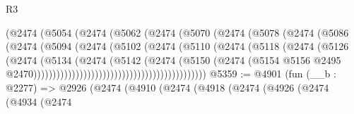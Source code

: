 \begin{lexlean}{R3}
\begin{coremodule}
                                      (@2474
                                        (@5054
                                          (@2474
                                            (@5062
                                              (@2474
                                                (@5070
                                                  (@2474
                                                    (@5078
                                                      (@2474
                                                        (@5086
                                                          (@2474
                                                            (@5094
                                                              (@2474
                                                                (@5102
                                                                  (@2474
                                                                    (@5110
                                                                      (@2474
                                                                        (@5118
                                                                          (@2474
                                                                            (@5126
                                                                              (@2474
                                                                                (@5134
                                                                                  (@2474
                                                                                    (@5142
                                                                                      (@2474
                                                                                        (@5150
                                                                                          (@2474
                                                                                            (@5154
                                                                                              @5156
                                                                                              @2495
                                                                                              @2470)))))))))))))))))))))))))))))))))))))))))))))
@5359 := @4901
    (fun (__b : @2277) =>
    @2926
      (@2474
        (@4910
          (@2474
            (@4918
              (@2474
                (@4926
                  (@2474
                    (@4934
                      (@2474

\end{coremodule}
\end{lexlean}
